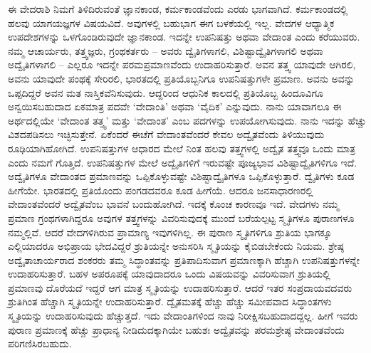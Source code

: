 ಈ ವೇದರಾಶಿ ನಿಮಗೆ ತಿಳಿದಿರುವಂತೆ ಜ್ಞಾನಕಾಂಡ, ಕರ್ಮಕಾಂಡವೆಂದು ಎರಡು ಭಾಗವಾಗಿದೆ. ಕರ್ಮಕಾಂಡದಲ್ಲಿ ಹಲವು ಯಾಗಯಜ್ಞಗಳ ವಿಷಯವಿದೆ. ಅವುಗಳಲ್ಲಿ ಬಹುಭಾಗ ಈಗ ಬಳಕೆಯಲ್ಲಿ ಇಲ್ಲ. ವೇದಗಳ ಆಧ್ಯಾತ್ಮಿಕ ಉಪದೇಶಗಳನ್ನು ಒಳಗೊಂಡಿರುವುದೇ ಜ್ಞಾನಕಾಂಡ. ಇದನ್ನೇ ಉಪನಿಷತ್ತು ಅಥವಾ ವೇದಾಂತ ಎಂದು ಕರೆಯುವರು. ನಮ್ಮ ಆಚಾರ್ಯರು, ತತ್ತ್ವಜ್ಞರು, ಗ್ರಂಥಕರ್ತರು – ಅವರು ದ್ವೈತಿಗಳಾಗಲಿ, ವಿಶಿಷ್ಟಾದ್ವೈತಿಗಳಾಗಲಿ ಅಥವಾ ಅದ್ವೈತಿಗಳಾಗಲಿ – ಎಲ್ಲರೂ ಇದನ್ನೇ ಪರಮಪ್ರಮಾಣವೆಂದು ಉದಾಹರಿಸುತ್ತಾರೆ. ಅವನ ತತ್ತ್ವ ಯಾವುದೇ ಆಗಿರಲಿ, ಅವನು ಯಾವುದೇ ಪಂಥಕ್ಕೆ ಸೇರಿರಲಿ, ಭಾರತದಲ್ಲಿ ಪ್ರತಿಯೊಬ್ಬನಿಗೂ ಉಪನಿಷತ್ತುಗಳೇ ಪ್ರಮಾಣ. ಅವನು ಅವನ್ನು ಒಪ್ಪದಿದ್ದರೆ ಅವನ ಮತ ನಾಸ್ತಿಕವೆನಿಸುವುದು. ಆದ್ದರಿಂದ ಆಧುನಿಕ ಕಾಲದಲ್ಲಿ ಪ್ರತಿಯೊಬ್ಬ ಹಿಂದೂವಿಗೂ ಅನ್ವಯಿಸಬಹುದಾದ ಏಕಮಾತ್ರ ಪದವೇ ‘ವೇದಾಂತಿ’ ಅಥವಾ ‘ವೈದಿಕ’ ಎನ್ನುವುದು. ನಾನು ಯಾವಾಗಲೂ ಈ ಅರ್ಥದಲ್ಲಿಯೇ ‘ವೇದಾಂತ ತತ್ತ್ವ’ ಮತ್ತು ‘ವೇದಾಂತ’ ಎಂಬ ಪದಗಳನ್ನು ಉಪಯೋಗಿಸುವುದು. ನಾನು ಇದನ್ನು ಹೆಚ್ಚು ವಿಶದಪಡಿಸಲು ಇಚ್ಛಿಸುತ್ತೇನೆ. ಏಕೆಂದರೆ ಈಚೆಗೆ ವೇದಾಂತವೆಂದರೆ ಕೇವಲ ಅದ್ವೈತವೆಂದು ತಿಳಿಯುವುದು ರೂಢಿಯಾಗಿಹೋಗಿದೆ. ಉಪನಿಷತ್ತುಗಳ ಆಧಾರದ ಮೇಲೆ ನಿಂತ ಹಲವು ತತ್ತ್ವಗಳಲ್ಲಿ ಅದ್ವೈತ ತತ್ತ್ವವೂ ಒಂದು ಮಾತ್ರ ಎಂದು ನಮಗೆ ಗೊತ್ತಿದೆ. ಉಪನಿಷತ್ತುಗಳ ಮೇಲೆ ಅದ್ವೈತಿಗಳಿಗೆ ಇರುವಷ್ಟೇ ಪೂಜ್ಯಭಾವ ವಿಶಿಷ್ಟಾದ್ವೈತಿಗಳಿಗೂ ಇದೆ. ಅದ್ವೈತಿಗಳೂ ವೇದಾಂತದ ಪ್ರಮಾಣವನ್ನು ಒಪ್ಪಿಕೊಳ್ಳುವಷ್ಟೇ ವಿಶಿಷ್ಟಾದ್ವೈತಿಗಳೂ ಒಪ್ಪಿಕೊಳ್ಳುತ್ತಾರೆ. ದ್ವೈತಿಗಳು ಕೂಡ ಹೀಗೆಯೇ. ಭಾರತದಲ್ಲಿ ಪ್ರತಿಯೊಂದು ಪಂಗಡದವರೂ ಕೂಡ ಹೀಗೆಯೆ. ಆದರೂ ಜನಸಾಧಾರಣರಲ್ಲಿ ವೇದಾಂತವೆಂದರೆ ಅದ್ವೈತವೆಂಬ ಭಾವನೆ ಬಂದುಹೋಗಿದೆ. ಇದಕ್ಕೆ ಕೊಂಚ ಕಾರಣವೂ ಇದೆ. ವೇದಗಳು ನಮ್ಮ ಪ್ರಮಾಣ ಗ್ರಂಥಗಳಾಗಿದ್ದರೂ ಅವುಗಳ ತತ್ತ್ವಗಳನ್ನು ವಿವರಿಸುವುದಕ್ಕೆ ಮುಂದೆ ಬರೆಯಲ್ಪಟ್ಟ ಸ್ಮೃತಿಗಳೂ ಪುರಾಣಗಳೂ ನಮ್ಮಲ್ಲಿವೆ. ಆದರೆ ವೇದಗಳಿಗಿರುವ ಪ್ರಾಮಾಣ್ಯ ಇವುಗಳಿಗಿಲ್ಲ. ಈ ಪುರಾಣ ಸ್ಮೃತಿಗಳಿಗೂ ಶ್ರುತಿಯ ಭಾಗಕ್ಕೂ ಎಲ್ಲಿಯಾದರೂ ಅಭಿಪ್ರಾಯ ಭೇದವಿದ್ದರೆ ಶ್ರುತಿಯನ್ನೇ ಅನುಸರಿಸಿ ಸ್ಮೃತಿಯನ್ನು ಕೈಬಿಡಬೇಕೆಂದು ನಿಯಮ. ಶ್ರೇಷ್ಠ ಅದ್ವೈತಾಚಾರ್ಯರಾದ ಶಂಕರರು ತಮ್ಮ ಸಿದ್ಧಾಂತವನ್ನು ಪ್ರತಿಪಾದಿಸುವಾಗ ಪ್ರಮಾಣಕ್ಕಾಗಿ ಹೆಚ್ಚಾಗಿ ಉಪನಿಷತ್ತುಗಳನ್ನೇ ಉದಾಹರಿಸುತ್ತಾರೆ. ಬಹಳ ಅಪರೂಪಕ್ಕೆ ಯಾವುದಾದರೂ ಒಂದು ವಿಷಯವನ್ನು ವಿವರಿಸುವಾಗ ಶ್ರುತಿಯಲ್ಲಿ ಪ್ರಮಾಣವು ದೊರೆಯದೆ ಇದ್ದರೆ ಆಗ ಮಾತ್ರ ಸ್ಮೃತಿಯನ್ನು ಉದಾಹರಿಸುತ್ತಾರೆ. ಆದರೆ ಇತರ ಸಂಪ್ರದಾಯವದವರು ಶ್ರುತಿಗಿಂತ ಹೆಚ್ಚಾಗಿ ಸ್ಮೃತಿಯನ್ನೇ ಉದಾಹರಿಸುತ್ತಾರೆ. ದ್ವೈತಮತಕ್ಕೆ ಹೆಚ್ಚು ಹೆಚ್ಚು ಸಮೀಪವಾದ ಸಿದ್ಧಾಂತಗಳು ಸ್ಮೃತಿಯನ್ನು ಉದಾಹರಿಸುವುದು ಹೆಚ್ಚುತ್ತದೆ. ಇದು ವೇದಾಂತಿಗಳಿಂದ ನಾವು ನಿರೀಕ್ಷಿಸಬಹುದಾದದ್ದಲ್ಲ. ಹೀಗೆ ಇವರು ಪುರಾಣ ಪ್ರಮಾಣಕ್ಕೆ ಹೆಚ್ಚು ಪ್ರಾಧಾನ್ಯ ನೀಡಿದುದಕ್ಕಾಗಿಯೇ ಬಹುಶಃ ಅದ್ವೈತವನ್ನು ಪರಮಶ್ರೇಷ್ಠ ವೇದಾಂತವೆಂದು ಪರಿಗಣಿಸಿರಬಹುದು.

